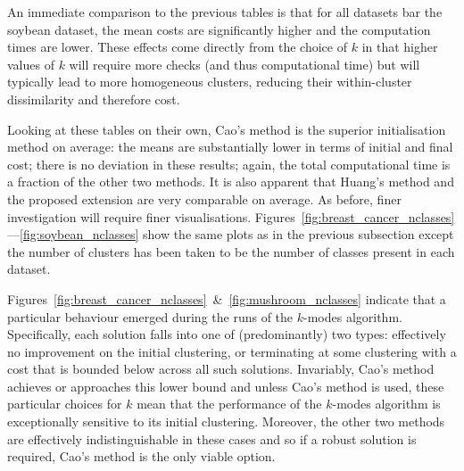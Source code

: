 \documentclass[11pt]{article}
\newlength{\tablewidth}
\begin{document}
\begin{table}[htbp]
{    }
    \label{tab:nursery_nclasses}\vspace{20pt}

    \label{tab:soybean_nclasses}
\end{table}

An immediate comparison to the previous tables is that for all datasets bar the
soybean dataset, the mean costs are significantly higher and the computation
times are lower. These effects come directly from the choice of \(k\) in that
higher values of \(k\) will require more checks (and thus computational time)
but will typically lead to more homogeneous clusters, reducing their
within-cluster dissimilarity and therefore cost.

Looking at these tables on their own, Cao's method is the superior
initialisation method on average: the means are substantially lower in terms of
initial and final cost; there is no deviation in these results; again, the total
computational time is a fraction of the other two methods. It is also apparent
that Huang's method and the proposed extension are very comparable on average.
As before, finer investigation will require finer visualisations.
Figures~\ref{fig:breast_cancer_nclasses}---\ref{fig:soybean_nclasses} show the
same plots as in the previous subsection except the number of clusters has been
taken to be the number of classes present in each dataset.

Figures~\ref{fig:breast_cancer_nclasses}~\&~\ref{fig:mushroom_nclasses} indicate
that a particular behaviour emerged during the runs of the \(k\)-modes
algorithm. Specifically, each solution falls into one of (predominantly) two
types: effectively no improvement on the initial clustering, or terminating at
some clustering with a cost that is bounded below across all such solutions.
Invariably, Cao's method achieves or approaches this lower bound and unless
Cao's method is used, these particular choices for \(k\) mean that the
performance of the \(k\)-modes algorithm is exceptionally sensitive to its
initial clustering. Moreover, the other two methods are effectively
indistinguishable in these cases and so if a robust solution is required, Cao's
method is the only viable option.
\end{document}

